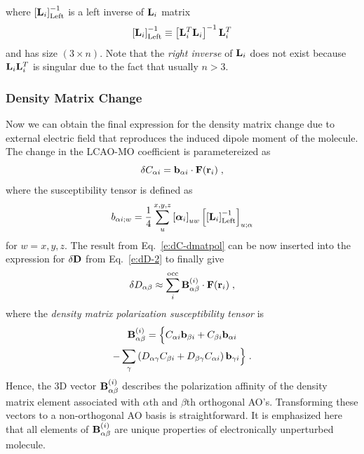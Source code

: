 \documentclass[aip,amsmath,amssymb,reprint]{revtex4-1}
\newcommand{\BM}[1]{\bm{#1}}
\begin{document}
%
where $\left[ {\bf L}_i  \right]^{-1}_{\rm Left}$ is a left inverse
of ${\bf L}_i$ matrix 
%
\begin{equation} 
      \left[ {\bf L}_i  \right]^{-1}_{\rm Left}   \equiv
       \left[ {\bf L}_i^T {\bf L}_i \right]^{-1} {\bf L}_i^T 
\end{equation}
%
and has size $(3\times n)$. Note that the \emph{right inverse} of ${\bf L}_i$
does not exist because ${\bf L}_i {\bf L}_i^T$ is singular due to the fact that usually
$n > 3$.

\subsubsection{Density Matrix Change}

Now we can obtain the final expression for the density matrix change 
due to external electric field that reproduces the 
induced dipole moment of the molecule.
The change in the LCAO\hyp{}MO coefficient is parametereized as
%
\begin{equation} \label{e:dC-dmatpol}
 \delta C_{\alpha i} = {\bf b}_{\alpha i} \cdot {\bf F}({\bf r}_i)  \;,
\end{equation}
%
where the susceptibility tensor is defined as
%
\begin{equation} \label{e:susceptibility-b}
  b_{\alpha i;w} = \frac{1}{4} \sum_u^{x, y, z} \left[ {\BM{\alpha}}_i \right]_{uw}
   \left[ \left[ {\bf L}_i  \right]^{-1}_{\rm Left} \right]_{u;\alpha}  
\end{equation}
%
for $w=x,y,z$. The result from Eq.~\eqref{e:dC-dmatpol} can be now inserted into 
the expression for $\delta {\bf D}$ from Eq.~\eqref{e:dD-2} to finally give
%
\begin{equation}\label{e:final-model.HF}
 \delta D_{\alpha\beta} \approx \sum_i^{\rm occ} {\bf B}^{(i)}_{\alpha\beta} \cdot {\bf F}({\bf r}_i)  \;,
\end{equation}
%
where the \emph{density matrix polarization susceptibility tensor} is
%
\begin{multline}  \label{e:susceptibility-B}
 {\bf B}^{(i)}_{\alpha\beta} = \Big\{
                               C_{\alpha i} {\bf b}_{\beta i} + C_{\beta i} {\bf b}_{\alpha i} \\
                                - \sum_\gamma 
                                 \left( 
               D_{\alpha\gamma} C_{\beta i} + D_{\beta\gamma} C_{\alpha i}
                                 \right)
                                           {\bf b}_{\gamma i}
%
\Big\}  \;.
\end{multline}
%
Hence, the 3D vector ${\bf B}^{(i)}_{\alpha\beta}$ describes the polarization affinity
of the density matrix element associated with $\alpha$th and $\beta$th orthogonal AO's.
Transforming these vectors to a non\hyp{}orthogonal AO basis is straightforward.
It is emphasized here that all elements of ${\bf B}_{\alpha\beta}^{(i)}$
are unique properties of electronically unperturbed molecule. 
\end{document}
